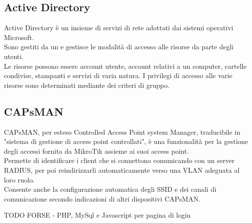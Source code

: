 \documentclass[Tesi.tex]{subfiles}
\begin{document}
\subsection{Active Directory}
Active Directory è un insieme di servizi di rete adottati dai sistemi operativi Microsoft. \\
Sono gestiti da un  e gestisce le modalità di accesso alle risorse da parte degli utenti. \\
Le risorse possono essere account utente, account relativi a un computer, cartelle condivise, stampanti e servizi di varia natura. I privilegi di accesso alle varie risorse sono determinati mediante dei criteri di gruppo.

\subsection{CAPsMAN}
CAPsMAN, per esteso Controlled Access Point system Manager, traducibile in "sistema di gestione di access point controllati", è una funzionalità per la gestione degli accessi fornita da MikroTik assieme ai suoi access point. \\
Permette di identificare i client che si connettono comunicando con un server RADIUS, per poi reindirizzarli automaticamente verso una VLAN adeguata al loro ruolo. \\
Consente anche la configurazione automatica degli SSID e dei canali di comunicazione secondo indicazioni di altri dispositivi CAPsMAN.

TODO FORSE - PHP, MySql e Javascript per pagina di login 
\end{document}
